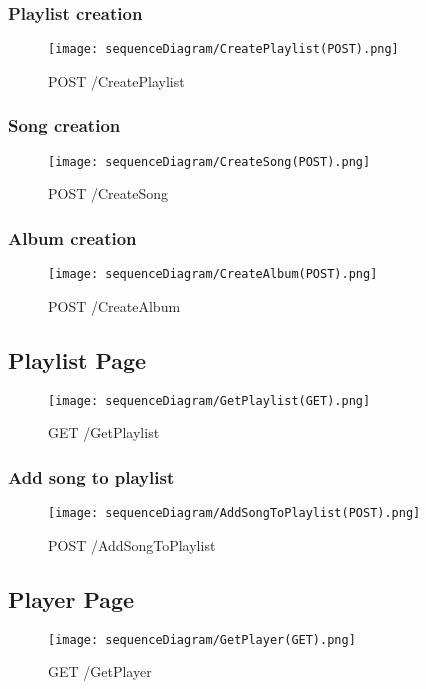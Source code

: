 \documentclass{article}
\begin{document}
\newpage
\subsubsection{Playlist creation}
\begin{figure}[h]
\centering
\texttt{[image: sequenceDiagram/CreatePlaylist(POST).png]}
\caption{POST /CreatePlaylist}
\label{fig:CreatePlaylist}
\end{figure}

\newpage
\subsubsection{Song creation}
\begin{figure}[h]
\centering
\texttt{[image: sequenceDiagram/CreateSong(POST).png]}
\caption{POST /CreateSong}
\label{fig:CreateSong}
\end{figure}

\newpage
\subsubsection{Album creation}
\begin{figure}[h]
\centering
\texttt{[image: sequenceDiagram/CreateAlbum(POST).png]}
\caption{POST /CreateAlbum}
\label{fig:CreateAlbum}
\end{figure}

\newpage
\subsection{Playlist Page}
\begin{figure}[h]
\centering
\texttt{[image: sequenceDiagram/GetPlaylist(GET).png]}
\caption{GET /GetPlaylist}
\label{fig:GetPlaylist}
\end{figure}


\newpage
\subsubsection{Add song to playlist}
\begin{figure}[h]
\centering
\texttt{[image: sequenceDiagram/AddSongToPlaylist(POST).png]}
\caption{POST /AddSongToPlaylist}
\label{fig:AddSongToPlaylist}
\end{figure}


\newpage
\subsection{Player Page}
\begin{figure}[h]
\centering
\texttt{[image: sequenceDiagram/GetPlayer(GET).png]}
\caption{GET /GetPlayer}
\label{fig:GetPlayer}
\end{figure}
\end{document}
